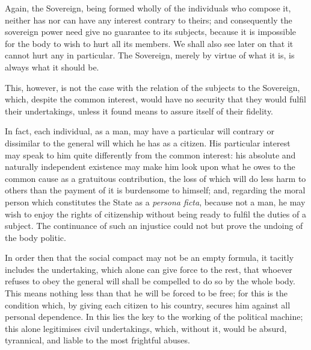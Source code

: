 \documentclass[12pt]{book}
\begin{document}
Again, the Sovereign, being formed wholly of the individuals who compose it, neither has nor can have any interest contrary to theirs; and consequently the sovereign power need give no guarantee to its subjects, because it is impossible for the body to wish to hurt all its members. We shall also see later on that it cannot hurt any in particular. The Sovereign, merely by virtue of what it is, is always what it should be.

This, however, is not the case with the relation of the subjects to the Sovereign, which, despite the common interest, would have no security that they would fulfil their undertakings, unless it found means to assure itself of their fidelity.

In fact, each individual, as a man, may have a particular will contrary or dissimilar to the general will which he has as a citizen. His particular interest may speak to him quite differently from the common interest: his absolute and naturally independent existence may make him look upon what he owes to the common cause as a gratuitous contribution, the loss of which will do less harm to others than the payment of it is burdensome to himself; and, regarding the moral person which constitutes the State as a \textit{persona ficta}, because not a man, he may wish to enjoy the rights of citizenship without being ready to fulfil the duties of a subject. The continuance of such an injustice could not but prove the undoing of the body politic.

In order then that the social compact may not be an empty formula, it tacitly includes the undertaking, which alone can give force to the rest, that whoever refuses to obey the general will shall be compelled to do so by the whole body. This means nothing less than that he will be forced to be free; for this is the condition which, by giving each citizen to his country, secures him against all personal dependence. In this lies the key to the working of the political machine; this alone legitimises civil undertakings, which, without it, would be absurd, tyrannical, and liable to the most frightful abuses.
\end{document}
